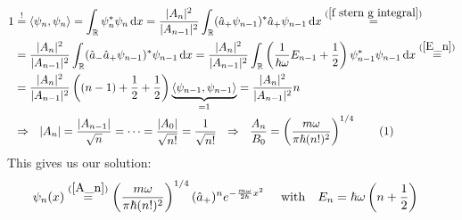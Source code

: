 \documentclass[a4paper,12pt]{article}
\newcommand\numberthis{\addtocounter{equation}{1}\tag{\theequation}}
\begin{document}
\begin{align*}
1&\overset{!}{=}\langle\psi_n,\psi_n\rangle=\int_\mathbb{R}\psi_n^\ast\psi_n\,\mathrm{d}x=\frac{|A_n|^2}{|A_{n-1}|^2}\int_\mathbb{R}(\hat{a}_+\psi_{n-1})^\ast\hat{a}_+\psi_{n-1}\,\mathrm{d}x\overset{(\ref{f stern g integral})}{=}\\
&=\frac{|A_n|^2}{|A_{n-1}|^2}\int_\mathbb{R}(\hat{a}_-\hat{a}_+\psi_{n-1})^\ast \psi_{n-1}\,\mathrm{d}x=\frac{|A_n|^2}{|A_{n-1}|^2}\int_\mathbb{R}\left(\frac{1}{\hbar\omega}E_{n-1}+\frac{1}{2}\right)\psi_{n-1}^\ast\psi_{n-1}\,\mathrm{d}x\overset{(\ref{E_n})}{=}\\
&=\frac{|A_n|^2}{|A_{n-1}|^2}\left((n-1)+\frac{1}{2}+\frac{1}{2}\right)\underbrace{\langle\psi_{n-1},\psi_{n-1}\rangle}_{=1}=\frac{|A_n|^2}{|A_{n-1}|^2}n\\
&\Rightarrow\ \ |A_n|=\frac{|A_{n-1}|}{\sqrt{n}}=\dots=\frac{|A_0|}{\sqrt{n!}}=\frac{1}{\sqrt{n!}}\ \ \Rightarrow\ \ \frac{A_n}{B_0}=\left(\frac{m\omega}{\pi\hbar (n!)^2}\right)^{1/4}\label{A_n}\numberthis
\end{align*}
This gives us our solution:
\begin{align*}
\psi_n(x)&\overset{(\ref{A_n})}{=}\left(\frac{m\omega}{\pi\hbar (n!)^2}\right)^{1/4}(\hat{a}_+)^ne^{-\frac{m\omega}{2\hbar}x^2}\ \ \ \ \mathrm{with }\ \ \ E_n=\hbar\omega \left(n
+\frac{1}{2}\right)
\end{align*}
\end{document}
